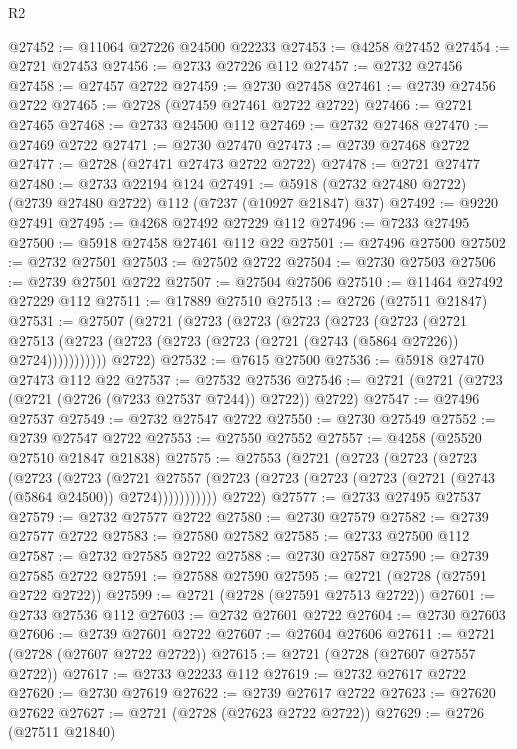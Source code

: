 \begin{lexlean}{R2}
\begin{coremodule}
@27452 := @11064 @27226 @24500 @22233
@27453 := @4258 @27452
@27454 := @2721 @27453
@27456 := @2733 @27226 @112
@27457 := @2732 @27456
@27458 := @27457 @2722
@27459 := @2730 @27458
@27461 := @2739 @27456 @2722
@27465 := @2728 (@27459 @27461 @2722 @2722)
@27466 := @2721 @27465
@27468 := @2733 @24500 @112
@27469 := @2732 @27468
@27470 := @27469 @2722
@27471 := @2730 @27470
@27473 := @2739 @27468 @2722
@27477 := @2728 (@27471 @27473 @2722 @2722)
@27478 := @2721 @27477
@27480 := @2733 @22194 @124
@27491 := @5918 (@2732 @27480 @2722) (@2739 @27480 @2722) @112 (@7237 (@10927 @21847) @37)
@27492 := @9220 @27491
@27495 := @4268 @27492 @27229 @112
@27496 := @7233 @27495
@27500 := @5918 @27458 @27461 @112 @22
@27501 := @27496 @27500
@27502 := @2732 @27501
@27503 := @27502 @2722
@27504 := @2730 @27503
@27506 := @2739 @27501 @2722
@27507 := @27504 @27506
@27510 := @11464 @27492 @27229 @112
@27511 := @17889 @27510
@27513 := @2726 (@27511 @21847)
@27531 := @27507
    (@2721
      (@2723
        (@2723
          (@2723
            (@2723
              (@2723
                (@2721
                  @27513
                  (@2723 (@2723 (@2723 (@2723 (@2721 (@2743 (@5864 @27226)) @2724)))))))))))
      @2722)
@27532 := @7615 @27500
@27536 := @5918 @27470 @27473 @112 @22
@27537 := @27532 @27536
@27546 := @2721 (@2721 (@2723 (@2721 (@2726 (@7233 @27537 @7244)) @2722)) @2722)
@27547 := @27496 @27537
@27549 := @2732 @27547 @2722
@27550 := @2730 @27549
@27552 := @2739 @27547 @2722
@27553 := @27550 @27552
@27557 := @4258 (@25520 @27510 @21847 @21838)
@27575 := @27553
    (@2721
      (@2723
        (@2723
          (@2723
            (@2723
              (@2723
                (@2721
                  @27557
                  (@2723 (@2723 (@2723 (@2723 (@2721 (@2743 (@5864 @24500)) @2724)))))))))))
      @2722)
@27577 := @2733 @27495 @27537
@27579 := @2732 @27577 @2722
@27580 := @2730 @27579
@27582 := @2739 @27577 @2722
@27583 := @27580 @27582
@27585 := @2733 @27500 @112
@27587 := @2732 @27585 @2722
@27588 := @2730 @27587
@27590 := @2739 @27585 @2722
@27591 := @27588 @27590
@27595 := @2721 (@2728 (@27591 @2722 @2722))
@27599 := @2721 (@2728 (@27591 @27513 @2722))
@27601 := @2733 @27536 @112
@27603 := @2732 @27601 @2722
@27604 := @2730 @27603
@27606 := @2739 @27601 @2722
@27607 := @27604 @27606
@27611 := @2721 (@2728 (@27607 @2722 @2722))
@27615 := @2721 (@2728 (@27607 @27557 @2722))
@27617 := @2733 @22233 @112
@27619 := @2732 @27617 @2722
@27620 := @2730 @27619
@27622 := @2739 @27617 @2722
@27623 := @27620 @27622
@27627 := @2721 (@2728 (@27623 @2722 @2722))
@27629 := @2726 (@27511 @21840)

\end{coremodule}
\end{lexlean}
